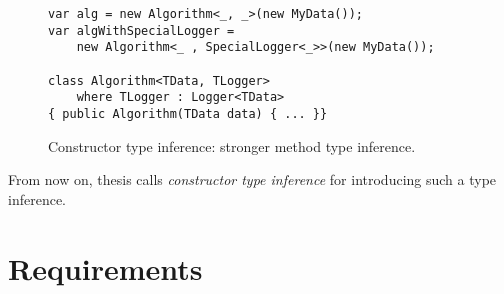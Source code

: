 \begin{figure}[h]
\begin{lstlisting}[style=csharp]
var alg = new Algorithm<_, _>(new MyData());
var algWithSpecialLogger = 
    new Algorithm<_ , SpecialLogger<_>>(new MyData());

class Algorithm<TData, TLogger> 
    where TLogger : Logger<TData> 
{ public Algorithm(TData data) { ... }}
\end{lstlisting}
\caption{Constructor type inference: stronger method type inference.}
\label{img38:sol2}
\end{figure}
\par
From now on, thesis calls \textit{constructor type inference} for introducing such a type inference.

\section{Requirements}

